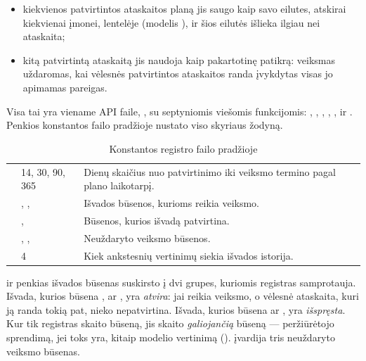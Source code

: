 \begin{itemize}
  \item kiekvienos patvirtintos ataskaitos planą jis saugo kaip savo eilutes, atskirai kiekvienai
    įmonei, lentelėje  (modelis ), ir šios eilutės
    išlieka ilgiau nei ataskaita;
  \item kitą patvirtintą ataskaitą jis naudoja kaip pakartotinę patikrą: veiksmas uždaromas, kai
    vėlesnės patvirtintos ataskaitos randa įvykdytas visas jo apimamas pareigas.
\end{itemize}

Visa tai yra viename API faile, , su septyniomis viešomis funkcijomis:
, , , , ,
 ir . Penkios konstantos failo pradžioje nustato viso skyriaus
žodyną.

\begin{table}[H]
\caption{Konstantos registro failo pradžioje}\label{tab:register:constants}
\begin{tabularx}{\textwidth}{@{}L{22mm}L{58mm}Y@{}}
\toprule
{} &  &  \\
\midrule
{} &  14,  30,  90,  365 &
  Dienų skaičius nuo patvirtinimo iki veiksmo termino pagal plano laikotarpį. \\
 & , ,  & Išvados būsenos, kurioms reikia veiksmo. \\
 & ,  & Būsenos, kurios išvadą patvirtina. \\
 & , ,  & Neuždaryto veiksmo būsenos. \\
 & 4 & Kiek ankstesnių vertinimų siekia išvados istorija. \\
\bottomrule
\end{tabularx}
\end{table}

 ir  penkias išvados būsenas suskirsto į dvi grupes, kuriomis registras
samprotauja. Išvada, kurios būsena ,  ar , yra
\emph{atvira}: jai reikia veiksmo, o vėlesnė ataskaita, kuri ją randa tokią pat, nieko
nepatvirtina. Išvada, kurios būsena  ar , yra \emph{išspręsta}. Kur tik
registras skaito būseną, jis skaito \emph{galiojančią} būseną --- peržiūrėtojo sprendimą, jei
toks yra, kitaip modelio vertinimą ().  įvardija tris neuždaryto
veiksmo būsenas.


